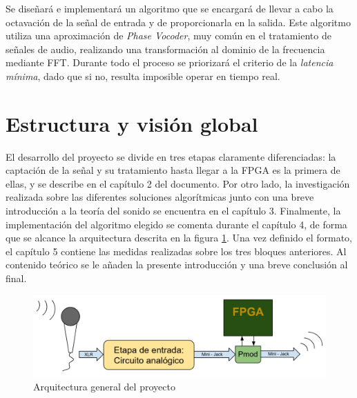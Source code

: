 Se diseñará e implementará un algoritmo que se encargará de llevar a cabo la octavación de la señal de entrada y de proporcionarla en la salida. Este algoritmo utiliza una aproximación de \emph{Phase Vocoder}, muy común en el tratamiento de señales de audio, realizando una transformación al dominio de la frecuencia mediante FFT. Durante todo el proceso se priorizará el criterio de la \emph{latencia mínima}, dado que si no, resulta imposible operar en tiempo real. 

\section{Estructura y visión global}

El desarrollo del proyecto se divide en tres etapas claramente diferenciadas: la captación de la señal y su tratamiento hasta llegar a la FPGA es la primera de ellas, y se describe en el capítulo 2 del documento. Por otro lado, la investigación realizada sobre las diferentes soluciones algorítmicas junto con una breve introducción a la teoría del sonido se encuentra en el capítulo 3. Finalmente, la implementación del algoritmo elegido se comenta durante el capítulo 4, de forma que se alcance la arquitectura descrita en la figura \ref{fig:arquitectura}. Una vez definido el formato, el capítulo 5 contiene las medidas realizadas sobre los tres bloques anteriores. Al contenido teórico se le añaden la presente introducción y una breve conclusión al final.

\begin{figure}
\begin{center}
\includegraphics[width=14cm]{img/arquitectura.png}
\caption{\label{fig:arquitectura}Arquitectura general del proyecto}
\end{center}
\end{figure}


